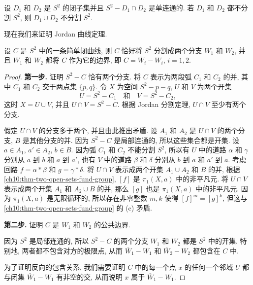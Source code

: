 \begin{theorem}\label{ch10:thm-general-nonseparation}
设 $D_{1}$ 和 $D_{2}$ 是 $S^{2}$ 的闭子集并且 $S^{2}-D_{1}\cap D_{2}$ 是单连通的. 若 $D_{1}$ 和 $D_{2}$ 都不分割 $S^{2}$, 则 $D_{1}\cup D_{2}$ 不分割 $S^{2}$.
\end{theorem}

现在我们来证明 Jordan 曲线定理.

\begin{theorem}\label{ch10:thm-jordan-curve}
设 $C$ 是 $S^{2}$ 中的一条简单闭曲线, 则 $C$ 恰好将 $S^{2}$ 分割成两个分支 $W_{1}$ 和 $W_{2}$, 并且 $W_{1}$ 和 $W_{2}$ 都将 $C$ 作为它的边界, 即 $C=\overline{W}_{i}-W_{i}$, $i=1,2$.
\end{theorem}

\begin{proof}
\textbf{第一步.} 证明 $S^{2}-C$ 恰有两个分支. 将 $C$ 表示为两段弧 $C_{1}$ 和 $C_{2}$ 的并, 其中 $C_{1}$ 和 $C_{2}$ 交于两点集 $\{p,q\}$. 令 $X$ 为空间 $S^{2}-p-q$, $U$ 和 $V$ 为两个开集
\[
U=S^{2}-C_{1}\quad\text{和}\quad V=S^{2}-C_{2},
\]
这时 $X=U\cup V$, 并且 $U\cap V=S^{2}-C$. 根据 Jordan 分割定理, $U\cap V$ 至少有两个分支.

假定 $U\cap V$ 的分支多于两个, 并且由此推出矛盾. 设 $A_{1}$ 和 $A_{2}$ 是 $U\cap V$ 的两个分支, $B$ 是其他分支的并. 因为 $S^{2}-C$ 是局部连通的, 所以这些集合都是开集. 设 $a\in A_{1}$, $a'\in A_{2}$, $b\in B$. 因为弧 $C_{1}$ 和 $C_{2}$ 不能分割 $S^{2}$, 所以有 $U$ 中的道路 $\alpha$ 和 $\gamma$ 分别从 $a$ 到 $b$ 和 $a$ 到 $a'$, 也有 $V$ 中的道路 $\beta$ 和 $\delta$ 分别从 $b$ 到 $a$ 和 $a'$ 到 $a$. 考虑回路 $f=\alpha*\beta$ 和 $g=\gamma*\delta$. 将 $U\cap V$ 表示成两个开集 $A_{1}\cup A_{2}$ 和 $B$ 的并, 根据 \cref{ch10:thm-two-open-sets-fund-group}, $[f]$ 是 $\pi_{1}(X,a)$ 中的非平凡元. 将 $U\cap V$ 表示成两个开集 $A_{1}$ 和 $A_{2}\cup B$ 的并, 那么 $[g]$ 也是 $\pi_{1}(X,a)$ 中的非平凡元. 因为 $\pi_{1}(X,a)$ 是无限循环的, 所以存在非零整数 $m,k$ 使得 $[f]^{m}=[g]^{k}$, 但这与 \cref{ch10:thm-two-open-sets-fund-group} 的 (c) 矛盾.

\textbf{第二步.} 证明 $C$ 是 $W_{1}$ 和 $W_{2}$ 的公共边界.

因为 $S^{2}$ 是局部连通的, 所以 $S^{2}-C$ 的两个分支 $W_{1}$ 和 $W_{2}$ 都是 $S^{2}$ 中的开集. 特别地, 两者都不包含对方的极限点, 从而 $\overline{W}_{1}-W_{1}$ 和 $\overline{W}_{2}-W_{2}$ 都包含在 $C$ 中.

为了证明反向的包含关系, 我们需要证明 $C$ 中的每一个点 $x$ 的任何一个邻域 $U$ 都与闭集 $\overline{W}_{1}-W_{1}$ 有非空的交, 从而说明 $x$ 属于 $\overline{W}_{1}-W_{1}$.


\end{proof}

